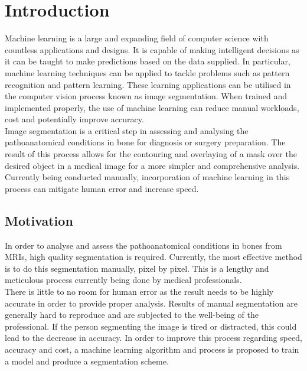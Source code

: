 \chapter{Introduction}
Machine learning is a large and expanding field of computer science with countless applications and designs. It is capable of making intelligent decisions as it can be taught to make predictions based on the data supplied. In particular, machine learning techniques can be applied to tackle problems such as pattern recognition and pattern learning. These learning applications can be utilised in the computer vision process known as image segmentation. When trained and implemented properly, the use of machine learning can reduce manual workloads, cost and potentially improve accuracy.
\\[1\baselineskip]
Image segmentation is a critical step in assessing and analysing the pathoanatomical conditions in bone for diagnosis or surgery preparation. The result of this process allows for the contouring and overlaying of a mask over the desired object in a medical image for a more simpler and comprehensive analysis. Currently being conducted manually, incorporation of machine learning in this process can mitigate human error and increase speed.

\section{Motivation}
In order to analyse and assess the pathoanatomical conditions in bones from MRIs, high quality segmentation is required. Currently, the most effective method is to do this segmentation manually, pixel by pixel. This is a lengthy and meticulous process currently being done by medical professionals.
\\[1\baselineskip]
There is little to no room for human error as the result needs to be highly accurate in order to provide proper analysis. Results of manual segmentation are generally hard to reproduce and are subjected to the well-being of the professional. If the person segmenting the image is tired or distracted, this could lead to the decrease in accuracy. In order to improve this process regarding speed, accuracy and cost, a machine learning algorithm and process is proposed to train a model and produce a segmentation scheme.